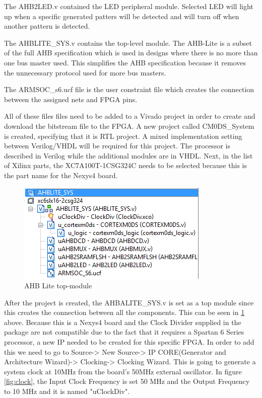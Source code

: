 The AHB2LED.v contained the LED peripheral module. Selected LED will light up when a specific generated patters will be detected and will turn off when another pattern is detected.

The AHBLITE\_SYS.v contains the top-level module. The AHB-Lite is a subset of the full AHB specification which is used in designs where there is no more than one bus master used. This simplifies the AHB specification because it removes the unnecessary protocol used for more bus masters.

The ARMSOC\_s6.ucf file is the user constraint file which creates the connection between the assigned nets and FPGA pins.

All of these files files need to be added to a Vivado project in order to create and download the bitstream file to the FPGA. A new project called CM0DS\_System is created, specifying that it is RTL project. A mixed implementation setting between Verilog/VHDL will be required for this project. The processor is described in Verilog while the additional modules are in VHDL. Next, in the list of Xilinx parts, the XC7A100T-1CSG324C needs to be selected because this is the part name for the Nexys4 board. 
\begin{figure}
\centering
\includegraphics[scale=0.7]{figures/AHBLITE_SYS_modules_ISE_schematic.PNG}
\caption{AHB Lite top-module } 
\label{fig:ahblite_sys}
\end{figure}

After the project is created, the AHBALITE\_SYS.v is set as a top module since this creates the connection between all the components. This can be seen in \ref{fig:ahblite_sys} above. Because this is a Nexys4 board and the Clock Divider supplied in the package are not compatible due to the fact that it requires a Spartan 6 Series processor, a new IP needed to be created for this specific FPGA. In order to add this we need to go to Source-> New Source-> IP CORE(Generator and Architecture Wizard)-> Clocking-> Clocking Wizard. This is going to generate a system clock at 10MHz from the board's 50MHz external oscillator. In figure \ref{fig:clock}, the Input Clock Frequency is set 50 MHz and the Output Frequency to 10 MHz and it is named "uClockDiv".

